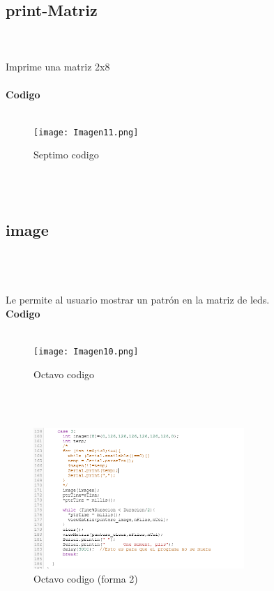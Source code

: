 \documentclass{article}
\begin{document}
\subsection{\large print-Matriz}\\\\
Imprime una matriz 2x8\\\\

\textbf{\large Codigo}\\\\
\begin{figure}[h]
    \texttt{[image: Imagen11.png]}
    \centering
    \caption{Septimo codigo}
    \label{fig:Imagen10}
\end{figure}\\\\

\subsection{\large image}\\\\
\\
Le permite al usuario mostrar un patrón en la matriz de leds.\\

\textbf{\large Codigo}\\\\
\begin{figure}[h]
    \texttt{[image: Imagen10.png]}
    \centering
    \caption{Octavo codigo}
    \label{fig:Imagen11}
\end{figure}\\\\
\begin{figure}[h]
    \includegraphics[width=8cm]{Imagen12.png}
    \centering
    \caption{Octavo codigo (forma 2)}
    \label{fig:Imagen12}
\end{figure}\\\\
\end{document}
